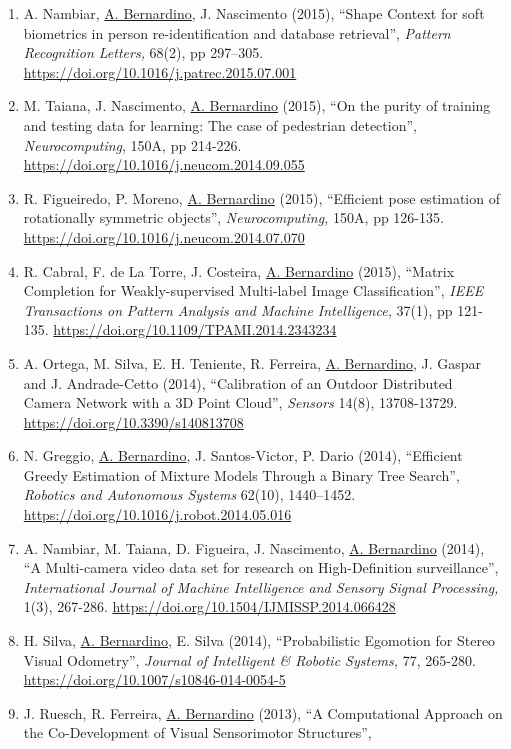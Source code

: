 \documentclass[
]{article}
\begin{document}
\begin{enumerate}
\item
  A. Nambiar, \ul{A. Bernardino}, J. Nascimento (2015), ``Shape Context
  for soft biometrics in person re-identification and database
  retrieval'', \emph{Pattern Recognition Letters,} 68(2), pp 297--305.
  \url{https://doi.org/10.1016/j.patrec.2015.07.001}
\item
  M. Taiana, J. Nascimento, \ul{A. Bernardino} (2015), ``On the purity
  of training and testing data for learning: The case of pedestrian
  detection'', \emph{Neurocomputing}, 150A, pp 214-226.
  \url{https://doi.org/10.1016/j.neucom.2014.09.055}
\item
  R. Figueiredo, P. Moreno, \ul{A. Bernardino} (2015), ``Efficient pose
  estimation of rotationally symmetric objects'', \emph{Neurocomputing,}
  150A, pp 126-135. \url{https://doi.org/10.1016/j.neucom.2014.07.070}
\item
  R. Cabral, F. de La Torre, J. Costeira, \ul{A. Bernardino} (2015),
  ``Matrix Completion for Weakly-supervised Multi-label Image
  Classification'', \emph{IEEE Transactions on} \emph{Pattern Analysis
  and Machine Intelligence,} 37(1), pp 121-135.
  \url{https://doi.org/10.1109/TPAMI.2014.2343234}~
\item
  A. Ortega, M. Silva, E. H. Teniente, R. Ferreira, \ul{A. Bernardino},
  J. Gaspar and J. Andrade-Cetto (2014), ``Calibration of an Outdoor
  Distributed Camera Network with a 3D Point Cloud'', \emph{Sensors}
  14(8), 13708-13729. \url{https://doi.org/10.3390/s140813708}
\item
  N. Greggio, \ul{A. Bernardino}, J. Santos-Victor, P. Dario (2014),
  ``Efficient Greedy Estimation of Mixture Models Through a Binary Tree
  Search'', \emph{Robotics and Autonomous Systems} 62(10), 1440--1452.
  \url{https://doi.org/10.1016/j.robot.2014.05.016}~
\item
  A. Nambiar, M. Taiana, D. Figueira, J. Nascimento, \ul{A. Bernardino}
  (2014), ``A Multi-camera video data set for research on
  High-Definition surveillance'', \emph{International Journal of Machine
  Intelligence and Sensory Signal Processing,} 1(3), 267-286.
  \url{https://doi.org/10.1504/IJMISSP.2014.066428}
\item
  H. Silva, \ul{A. Bernardino}, E. Silva (2014), ``Probabilistic
  Egomotion for Stereo Visual Odometry'', \emph{Journal of Intelligent
  \& Robotic Systems,} 77, 265-280.
  \url{https://doi.org/10.1007/s10846-014-0054-5}
\item
  J. Ruesch, R. Ferreira, \ul{A. Bernardino} (2013), ``A Computational
  Approach on the Co-Development of Visual Sensorimotor Structures'',

\end{enumerate}
\end{document}
